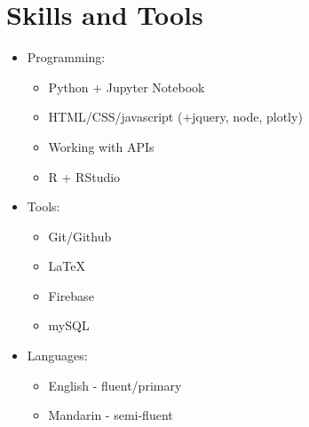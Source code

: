 \documentclass[letterpaper]{article}
\begin{document}
\section*{Skills and Tools}
\begin{itemize}
\item Programming:
  \begin{itemize}
  \item Python + Jupyter Notebook
  \item HTML/CSS/javascript (+jquery, node, plotly)
  \item Working with APIs
  \item R + RStudio
  \end{itemize}
\item Tools:
  \begin{itemize}
  \item Git/Github  
  \item LaTeX
  \item Firebase
  \item mySQL
  \end{itemize}
\item Languages:
  \begin{itemize}
  \item English - fluent/primary
  \item Mandarin - semi-fluent
  \end{itemize}
\end{itemize}
\end{document}
